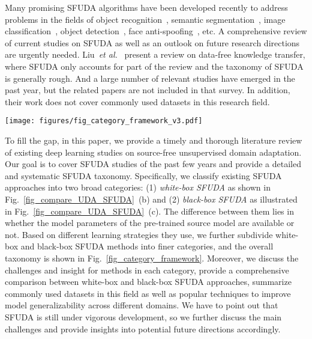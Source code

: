 \documentclass[10pt,journal,compsoc]{IEEEtran}
\def\etal{{\em et al.}}
\begin{document}
Many promising SFUDA algorithms have been developed recently to address problems in the fields of object recognition~\cite{kundu2022concurrentsub}, semantic segmentation~\cite{liu2021sourceseman}, image classification~\cite{chen2021self}, object detection~\cite{saltori2020sf}, face anti-spoofing~\cite{liu2022sourceCon}, etc.
A comprehensive review of current studies on SFUDA as well as an outlook on future research directions are urgently needed.
Liu~\etal~\cite{liu2021data} present a review on data-free knowledge transfer, where SFUDA only accounts for part of the review and the taxonomy of SFUDA is generally rough. 
And a large number of relevant studies have emerged in the past year, but the related papers are not included in that survey.
In addition, their work does not cover commonly used datasets in this research field. %


\begin{figure*}[!t]
\setlength{\abovecaptionskip}{0pt}
\setlength{\belowcaptionskip}{-2pt}
\setlength{\abovedisplayskip}{-2pt}
\setlength{\belowdisplayskip}{-2pt}
	\centering
	\texttt{[image: figures/fig\_category\_framework\_v3.pdf]}
	\caption{Taxonomy of existing source-free unsupervised domain adaptation (SFUDA) methods, as well as future outlook.}
	\label{fig_category_framework}
\end{figure*}

To fill the gap, in this paper, we provide a timely and thorough literature review of existing deep learning studies on source-free unsupervised domain adaptation.
Our goal is to cover SFUDA studies of the past few years and provide a detailed and systematic SFUDA taxonomy. 
Specifically, we classify existing SFUDA approaches into two broad categories: (1) \emph{white-box SFUDA} as shown in Fig.~\ref{fig_compare_UDA_SFUDA}~(b) and (2) \emph{black-box SFUDA} as illustrated in Fig.~\ref{fig_compare_UDA_SFUDA}~(c). 
The difference between them lies in whether the model parameters of the pre-trained source model are available or not.
Based on different learning strategies they use, we further subdivide white-box and black-box SFUDA methods into finer categories, and the overall taxonomy is shown in Fig.~\ref{fig_category_framework}. 
Moreover, we discuss the challenges and insight for methods in each category, provide a comprehensive comparison between white-box and black-box SFUDA approaches, summarize commonly used datasets in this field as well as popular techniques to improve model generalizability across different domains.
We have to point out that SFUDA is still under vigorous development, so we further discuss the main challenges and provide insights into potential future directions accordingly.
\end{document}
